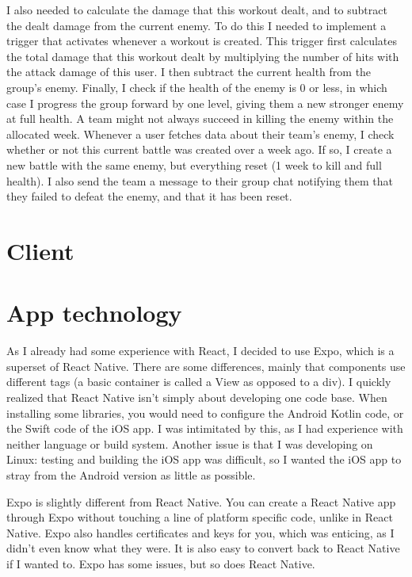 \documentclass{l4proj}
\begin{document}


I also needed to calculate the damage that this workout dealt, and to subtract the dealt damage from the current enemy. To do this I needed to implement a trigger that activates whenever a workout is created. This trigger first calculates the total damage that this workout dealt by multiplying the number of hits with the attack damage of this user. I then subtract the current health from the group's enemy. Finally, I check if the health of the enemy is 0 or less, in which case I progress the group forward by one level, giving them a new stronger enemy at full health. A team might not always succeed in killing the enemy within the allocated week. Whenever a user fetches data about their team's enemy, I check whether or not this current battle was created over a week ago. If so, I create a new battle with the same enemy, but everything reset (1 week to kill and full health). I also send the team a message to their group chat notifying them that they failed to defeat the enemy, and that it has been reset.


\section{Client}
\section{App technology}
As I already had some experience with React, I decided to use Expo, which is a superset of React Native. There are some differences, mainly that components use different tags (a basic container is called a View as opposed to a div). I quickly realized that React Native isn't simply about developing one code base. When installing some libraries, you would need to configure the Android Kotlin code, or the Swift code of the iOS app. I was intimitated by this, as I had experience with neither language or build system. Another issue is that I was developing on Linux: testing and building the iOS app was difficult, so I wanted the iOS app to stray from the Android version as little as possible.

Expo is slightly different from React Native. You can create a React Native app through Expo without touching a line of platform specific code, unlike in React Native. Expo also handles certificates and keys for you, which was enticing, as I didn't even know what they were. It is also easy to convert back to React Native if I wanted to. Expo has some issues, but so does React Native. 
\end{document}
